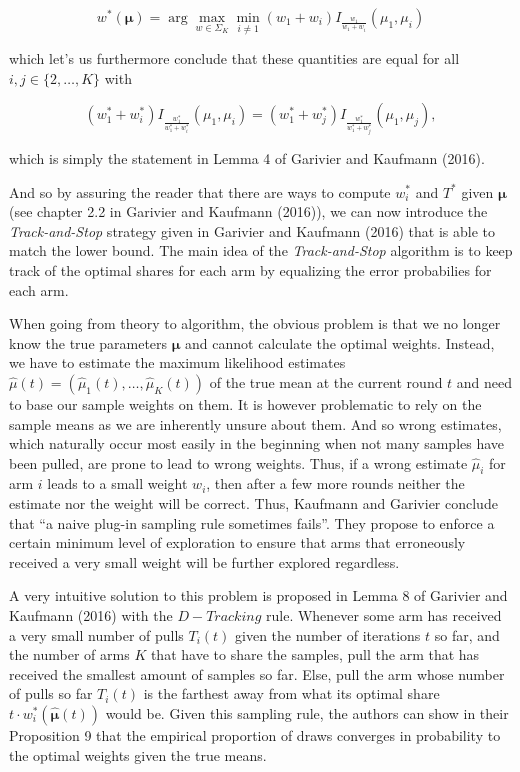 \documentclass[11pt,]{article}
\begin{document}
\begin{equation*}
w^*(\bm{\mu}) = \arg \max_{w \in \Sigma_K} \min_{i \neq 1} (w_1 + w_i) I_{\frac{w_1}{w_1+w_i}}(\mu_1, \mu_i)
\end{equation*}

which let's us furthermore conclude that these quantities are equal for
all \(i,j \in \{2,\dots, K\}\) with

\begin{equation*}
(w_1^* + w_i^*) I_{\frac{w_1^*}{w_1^*+w_i^*}}(\mu_1, \mu_i) = (w_1^* + w_j^*) I_{\frac{w_1^*}{w_1^*+w_j^*}}(\mu_1, \mu_j),
\end{equation*}

which is simply the statement in Lemma 4 of Garivier and Kaufmann
(2016).

And so by assuring the reader that there are ways to compute \(w_i^*\)
and \(T^*\) given \(\bm{\mu}\) (see chapter 2.2 in Garivier and Kaufmann
(2016)), we can now introduce the \emph{Track-and-Stop} strategy given
in Garivier and Kaufmann (2016) that is able to match the lower bound.
The main idea of the \emph{Track-and-Stop} algorithm is to keep track of
the optimal shares for each arm by equalizing the error probabilies for
each arm.

When going from theory to algorithm, the obvious problem is that we no
longer know the true parameters \(\bm{\mu}\) and cannot calculate the
optimal weights. Instead, we have to estimate the maximum likelihood
estimates \(\hat{\mu}(t) = (\hat{\mu}_1(t), \dots, \hat{\mu}_K(t))\) of
the true mean at the current round \(t\) and need to base our sample
weights on them. It is however problematic to rely on the sample means
as we are inherently unsure about them. And so wrong estimates, which
naturally occur most easily in the beginning when not many samples have
been pulled, are prone to lead to wrong weights. Thus, if a wrong
estimate \(\hat{\mu}_i\) for arm \(i\) leads to a small weight \(w_i\),
then after a few more rounds neither the estimate nor the weight will be
correct. Thus, Kaufmann and Garivier conclude that ``a naive plug-in
sampling rule sometimes fails''. They propose to enforce a certain
minimum level of exploration to ensure that arms that erroneously
received a very small weight will be further explored regardless.

A very intuitive solution to this problem is proposed in Lemma 8 of
Garivier and Kaufmann (2016) with the \(D-Tracking\) rule. Whenever some
arm has received a very small number of pulls \(T_i(t)\) given the
number of iterations \(t\) so far, and the number of arms \(K\) that
have to share the samples, pull the arm that has received the smallest
amount of samples so far. Else, pull the arm whose number of pulls so
far \(T_i(t)\) is the farthest away from what its optimal share
\(t\cdot w^*_i(\hat{\bm{\mu}}(t))\) would be. Given this sampling rule,
the authors can show in their Proposition 9 that the empirical
proportion of draws converges in probability to the optimal weights
given the true means.
\end{document}
